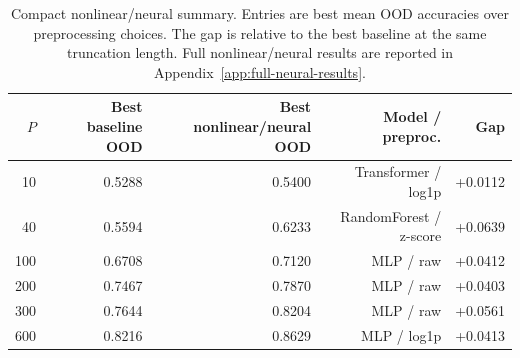 \begin{table}[t]
\centering
\small
\begin{tabular}{rrrrr}
\hline\hline
\(P\) & Best baseline OOD & Best nonlinear/neural OOD & Model / preproc. & Gap \\
\hline
10 & 0.5288 & 0.5400 & Transformer / log1p & +0.0112 \\
40 & 0.5594 & 0.6233 & RandomForest / z-score & +0.0639 \\
100 & 0.6708 & 0.7120 & MLP / raw & +0.0412 \\
200 & 0.7467 & 0.7870 & MLP / raw & +0.0403 \\
300 & 0.7644 & 0.8204 & MLP / raw & +0.0561 \\
600 & 0.8216 & 0.8629 & MLP / log1p & +0.0413 \\
\hline\hline
\end{tabular}
\caption{Compact nonlinear/neural summary. Entries are best mean OOD accuracies over preprocessing choices. The gap is relative to the best baseline at the same truncation length. Full nonlinear/neural results are reported in Appendix~\ref{app:full-neural-results}.}
\label{tab:neural-main}
\end{table}
